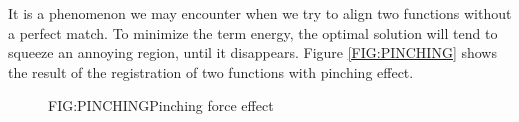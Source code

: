 
It is a phenomenon we may encounter when we try to align two functions without a
perfect match. To minimize the term energy, the optimal solution will tend to
squeeze an annoying region, until it disappears. Figure \ref{FIG:PINCHING}
shows the result of the registration of two functions with pinching effect.

 \begin{figure}[Pinching force effect]{FIG:PINCHING}{Pinching force effect}
    \quad
 \end{figure}
